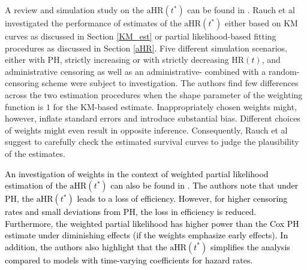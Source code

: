 \documentclass{article}
\newcommand{\NEW}[2][black]{\textcolor{#1}{#2}}
\begin{document}
\noindent A review and simulation study on the $\text{aHR}(t^*)$ can be found in \cite{Rauch.2018}.
Rauch et al \cite{Rauch.2018} investigated the performance of estimates of the $\text{aHR}(t^*)$ either based on KM curves as discussed in Section \ref{KM_est} or partial likelihood-based fitting procedures as discussed in Section \ref{aHR}. 
Five different simulation scenarios, either with PH, strictly increasing or with strictly decreasing $\text{HR}(t)$, and administrative censoring as well as an administrative- combined with a random-censoring scheme were subject to investigation. 
The authors find few differences across the two estimation procedures when the shape parameter of the weighting function is $1$ for the KM-based estimate.
Inappropriately chosen weights might, however, inflate standard errors and introduce substantial bias. Different choices of weights might even result in opposite inference.
Consequently, Rauch et al \cite{Rauch.2018} suggest to carefully check the estimated survival curves to judge the plausibility of the estimates. 

\NEW{An investigation of weights in the context of weighted partial likelihood estimation of the $\text{aHR}(t^*)$ can also be found in \cite{Schemper.2009}.
The authors note that under PH, the $\text{aHR}(t^*)$ leads to a loss of efficiency.
However, for higher censoring rates and small deviations from PH, the loss in efficiency is reduced.
Furthermore, the weighted partial likelihood has higher power than the Cox PH estimate under diminishing effects (if the weights emphasize early effects).
In addition, the authors also highlight that the $\text{aHR}(t^*)$ simplifies the analysis compared to models with time-varying coefficients for hazard rates.}
\end{document}
